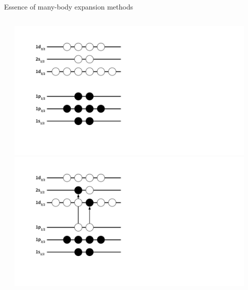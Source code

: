 \documentclass[aspectratio=169]{beamer}
\begin{document}
\begin{frame}{Essence of many-body expansion methods}
\begin{columns}[t]
\begin{column}{0.7\textwidth}
    \end{column}
    \begin{column}{0.30\textwidth}
      \begin{center}
        \begin{overprint}
          \centering\includegraphics[trim=2cm 2.5cm 13cm 1.5cm, clip, width=0.95\textwidth]{thesis/talk/images/o16_reference_state.pdf}
          \centering\includegraphics[trim=2cm 2.5cm 13cm 1.5cm, clip, width=0.95\textwidth]{thesis/talk/images/o16_2p2h_state.pdf}
        \end{overprint}
      \end{center}
    \end{column}
  \end{columns}
  \begin{center}
  \end{center}
\end{frame}
\end{document}
